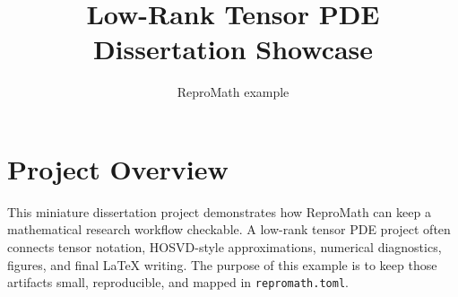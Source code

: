 \documentclass{article}
\title{Low-Rank Tensor PDE Dissertation Showcase}
\author{ReproMath example}
\date{}
\begin{document}
\maketitle

\section{Project Overview}

This miniature dissertation project demonstrates how ReproMath can keep a
mathematical research workflow checkable. A low-rank tensor PDE project often
connects tensor notation, HOSVD-style approximations, numerical diagnostics,
figures, and final LaTeX writing. The purpose of this example is to keep those
artifacts small, reproducible, and mapped in \texttt{repromath.toml}.



\end{document}
